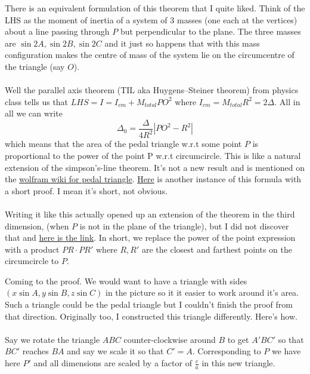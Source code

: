 \documentclass{article}
\begin{document}
\begin{tcolorbox}
There is an equivalent formulation of this theorem that I quite liked. Think of the LHS as the moment of inertia of a system of 3 masses (one each at the vertices) about a line passing through $P$ but perpendicular to the plane. The three masses are $\sin 2A, \sin 2B, \sin 2C$ and it just so happens that with this mass configuration makes the centre of mass of the system lie on the circumcentre of the triangle (say $O$). 
\\\\
Well the parallel axis theorem (TIL aka Huygens–Steiner theorem) from physics class tells us that $LHS = I = I_{cm} + M_{total} PO^2$ where $I_{cm} = M_{total}R^2 = 2\Delta$. All in all we can write $$\Delta_0 = \frac{\Delta}{4R^2}\left|PO^2-R^2\right|$$
which means that the area of the pedal triangle w.r.t some point $P$ is proportional to the power of the point P w.r.t circumcircle. This is like a natural extension of the simpson's-line theorem. It's not a new result and is mentioned on the \href{https://mathworld.wolfram.com/PedalTriangle.html}{wolfram wiki for pedal triangle}. \href{http://users.math.uoc.gr/~pamfilos/eGallery/problems/AreaOfPedal.html}{Here} is another instance of this formula with a short proof. I mean it's short, not obvious. 
\\\\
Writing it like this actually opened up an extension of the theorem in the third dimension, (when $P$ is not in the plane of the triangle), but I did not discover that and \href{https://math.stackexchange.com/a/3511837/420484}{here is the link}. In short, we replace the power of the point expression with a product $PR\cdot PR'$ where $R,R'$ are the closest and farthest points on the circumcircle to $P$.
\end{tcolorbox}

Coming to the proof. We would want to have a triangle with sides $(x\sin A, y\sin B, z\sin C)$ in the picture so it it easier to work around it's area. Such a triangle could be the pedal triangle but I couldn't finish the proof from that direction. Originally too, I constructed this triangle differently. Here's how.
\\\\
Say we rotate the triangle $ABC$ counter-clockwise around $B$ to get $A'BC'$ so that $BC'$ reaches $BA$ and say we scale it so that $C' = A$. Corresponding to $P$ we have here $P'$ and all dimensions are scaled by a factor of $\frac{c}{a}$ in this new triangle.
\end{document}
